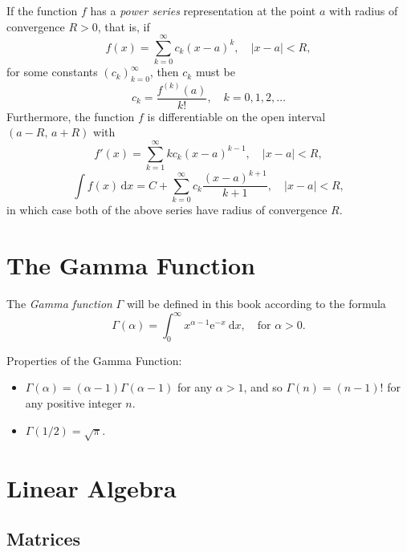 \documentclass[captions=tableheading]{scrbook}
\begin{document}
If the function $f$ has a \emph{power series} representation at the point $a$ with radius of convergence $R>0$, that is, if
\begin{equation}
f(x)=\sum_{k=0}^{\infty}c_{k}(x-a)^{k},\quad|x-a|<R,
\end{equation}
for some constants $\left(c_{k}\right)_{k=0}^{\infty}$, then $c_{k}$ must be
\begin{equation}
c_{k}=\frac{f^{(k)}(a)}{k!},\quad k=0,1,2,\ldots
\end{equation}
Furthermore, the function $f$ is differentiable on the open interval $(a-R,\, a+R)$ with
\begin{equation}
f'(x)=\sum_{k=1}^{\infty}kc_{k}(x-a)^{k-1},\quad|x-a|<R,
\end{equation}
\begin{equation}
\int f(x)\,\mathrm{d} x=C+\sum_{k=0}^{\infty}c_{k}\frac{(x-a)^{k+1}}{k+1},\quad|x-a|<R,
\end{equation}
in which case both of the above series have radius of convergence $R$.
\section{The Gamma Function \label{sec:The-Gamma-Function}}
\label{sec-6-4}


The \emph{Gamma function} $\Gamma$ will be defined in this book according to the formula
\begin{equation}
\Gamma(\alpha)=\int_{0}^{\infty}x^{\alpha-1}\mathrm{e}^{-x}\:\mathrm{d} x,\quad\mbox{for }\alpha > 0.
\end{equation}

\begin{fact}
Properties of the Gamma Function:
\begin{itemize}
\item $\Gamma(\alpha)=(\alpha - 1)\Gamma(\alpha - 1)$ for any $\alpha > 1$, and so $\Gamma(n)=(n-1)!$ for any positive integer $n$.
\item $\Gamma(1/2)=\sqrt{\pi}$.
\end{itemize}
\end{fact}
\section{Linear Algebra \label{sec:Linear-Algebra}}
\label{sec-6-5}
\subsection{Matrices}
\label{sec-6-5-1}
\end{document}
